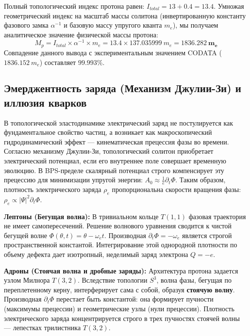 \documentclass[12pt,a4paper]{article}
\begin{document}
	Полный топологический индекс протона равен: $I_{total} = 13 + 0.4 = 13.4$.
	Умножая геометрический индекс на масштаб массы солитона (инвертированную константу фазового замка $\alpha^{-1}$ и базовую массу упругого кванта $m_e$), мы получаем аналитическое значение физической массы протона:
	\begin{equation}
		M_p = I_{total} \times \alpha^{-1} \times m_e = 13.4 \times 137.035999 \ m_e = \mathbf{1836.282 \ m_e}
	\end{equation}
	Совпадение данного вывода с экспериментальным значением CODATA ($1836.152 \ m_e$) составляет $99.993\%$.
	
	\subsection{Эмерджентность заряда (Механизм Джулии-Зи) и иллюзия кварков}
	
	В топологической эластодинамике электрический заряд не постулируется как фундаментальное свойство частиц, а возникает как макроскопический гидродинамический эффект — кинематическая прецессия фазы во времени. Согласно механизму Джулии-Зи, топологический солитон приобретает электрический потенциал, если его внутреннее поле совершает временную эволюцию. В BPS-пределе скалярный потенциал строго компенсирует эту прецессию для минимизации упругой энергии: $A_0 \approx \frac{1}{e} \partial_t \Phi$. 
	Таким образом, плотность электрического заряда $\rho_e$ пропорциональна скорости вращения фазы: $\rho_e \propto |\Psi|^2 \partial_t \Phi$.
	
	\textbf{Лептоны (Бегущая волна):} В тривиальном кольце $T(1,1)$ фазовая траектория не имеет самопересечений. Решение волнового уравнения сводится к чистой бегущей волне $\Phi(\theta, t) = \theta - \omega_e t$. Производная $\partial_t \Phi = -\omega_e$ является строгой пространственной константой. Интегрирование этой однородной плотности по объему дефекта дает изотропный, неделимый заряд электрона $Q = -e$.
	
	\textbf{Адроны (Стоячая волна и дробные заряды):} Архитектура протона задается узлом Милнора $T(3,2)$. Вследствие топологии $S^3$, волна фазы, бегущая по переплетенному керну, интерферирует сама с собой, образуя \textbf{стоячую волну}. Производная $\partial_t \Phi$ перестает быть константой: она формирует пучности (максимумы прецессии) и геометрические узлы (нули прецессии). 
	Плотность электрического заряда концентрируется строго в трех пучностях стоячей волны — лепестках трилистника $T(3,2)$. 
	
\end{document}
